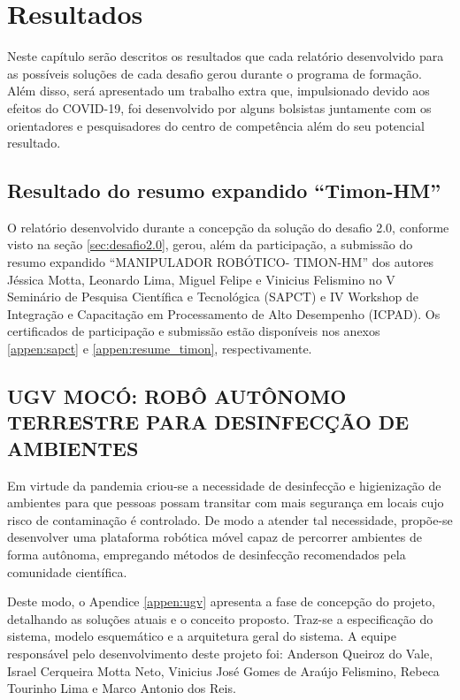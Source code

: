 \chapter{Resultados}
\label{chap:result}
Neste capítulo serão descritos os resultados que cada relatório desenvolvido para as possíveis soluções de cada desafio gerou durante o programa de formação. Além disso, será apresentado um trabalho extra que, impulsionado devido aos efeitos do COVID-19, foi desenvolvido por alguns bolsistas juntamente com os orientadores e pesquisadores do centro de competência além do seu potencial resultado. 

\section{Resultado do resumo expandido ``Timon-HM''}
\label{sec:testu}

O relatório desenvolvido durante a concepção da solução do desafio 2.0, conforme visto na seção \ref{sec:desafio2.0}, gerou, além da participação, a submissão do resumo expandido ``MANIPULADOR ROBÓTICO- TIMON-HM'' dos autores Jéssica Motta, Leonardo Lima, Miguel Felipe e Vinicius Felismino no V Seminário de Pesquisa Científica e
Tecnológica (SAPCT) e IV Workshop de Integração e Capacitação em Processamento de Alto Desempenho (ICPAD). Os certificados de participação e submissão estão disponíveis nos anexos \ref{appen:sapct} e \ref{appen:resume_timon}, respectivamente.

\section{UGV MOCÓ: ROBÔ AUTÔNOMO TERRESTRE PARA DESINFECÇÃO DE AMBIENTES}
\label{sec:ugv}

Em virtude da pandemia criou-se a necessidade de desinfecção e higienização de ambientes para que pessoas possam transitar com mais segurança em locais cujo risco de contaminação é controlado. De modo a atender tal necessidade, propõe-se desenvolver uma plataforma robótica móvel capaz de percorrer ambientes de forma autônoma, empregando métodos
de desinfecção recomendados pela comunidade científica. 

Deste modo, o Apendice \ref{appen:ugv} apresenta a fase de concepção do projeto, detalhando as soluções atuais e o conceito proposto. Traz-se a especificação do sistema, modelo esquemático e a arquitetura geral do sistema. A equipe responsável pelo desenvolvimento deste projeto foi: Anderson Queiroz do Vale, Israel Cerqueira Motta Neto, Vinicius José Gomes de Araújo Felismino, Rebeca Tourinho Lima e Marco Antonio dos Reis.


